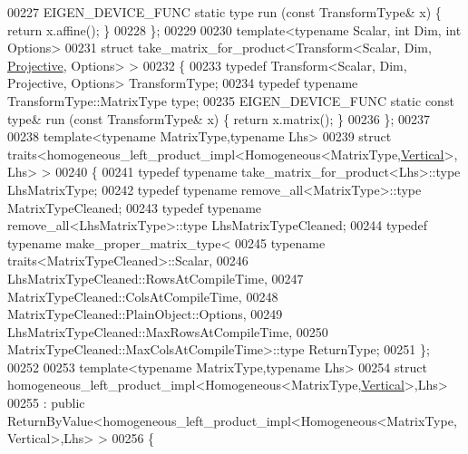 \begin{DoxyCode}
00227   EIGEN\_DEVICE\_FUNC \textcolor{keyword}{static} type run (\textcolor{keyword}{const} TransformType& x) \{ \textcolor{keywordflow}{return} x.affine(); \}
00228 \};
00229 
00230 \textcolor{keyword}{template}<\textcolor{keyword}{typename} Scalar, \textcolor{keywordtype}{int} Dim, \textcolor{keywordtype}{int} Options>
00231 \textcolor{keyword}{struct }take\_matrix\_for\_product<Transform<Scalar, Dim, \hyperlink{group__enums_ggaee59a86102f150923b0cac6d4ff05107aead6a2de12a17aaa4f5c523215dfccad}{Projective}, Options> >
00232 \{
00233   \textcolor{keyword}{typedef} Transform<Scalar, Dim, Projective, Options> TransformType;
00234   \textcolor{keyword}{typedef} \textcolor{keyword}{typename} TransformType::MatrixType type;
00235   EIGEN\_DEVICE\_FUNC \textcolor{keyword}{static} \textcolor{keyword}{const} type& run (\textcolor{keyword}{const} TransformType& x) \{ \textcolor{keywordflow}{return} x.matrix(); \}
00236 \};
00237 
00238 \textcolor{keyword}{template}<\textcolor{keyword}{typename} MatrixType,\textcolor{keyword}{typename} Lhs>
00239 \textcolor{keyword}{struct }traits<homogeneous\_left\_product\_impl<Homogeneous<MatrixType,\hyperlink{group__enums_ggad49a7b3738e273eb00932271b36127f7addca718e0564723df21d61b94b1198be}{Vertical}>,Lhs> >
00240 \{
00241   \textcolor{keyword}{typedef} \textcolor{keyword}{typename} take\_matrix\_for\_product<Lhs>::type LhsMatrixType;
00242   \textcolor{keyword}{typedef} \textcolor{keyword}{typename} remove\_all<MatrixType>::type MatrixTypeCleaned;
00243   \textcolor{keyword}{typedef} \textcolor{keyword}{typename} remove\_all<LhsMatrixType>::type LhsMatrixTypeCleaned;
00244   \textcolor{keyword}{typedef} \textcolor{keyword}{typename} make\_proper\_matrix\_type<
00245                  \textcolor{keyword}{typename} traits<MatrixTypeCleaned>::Scalar,
00246                  LhsMatrixTypeCleaned::RowsAtCompileTime,
00247                  MatrixTypeCleaned::ColsAtCompileTime,
00248                  MatrixTypeCleaned::PlainObject::Options,
00249                  LhsMatrixTypeCleaned::MaxRowsAtCompileTime,
00250                  MatrixTypeCleaned::MaxColsAtCompileTime>::type ReturnType;
00251 \};
00252 
00253 \textcolor{keyword}{template}<\textcolor{keyword}{typename} MatrixType,\textcolor{keyword}{typename} Lhs>
00254 \textcolor{keyword}{struct }homogeneous\_left\_product\_impl<Homogeneous<MatrixType,\hyperlink{group__enums_ggad49a7b3738e273eb00932271b36127f7addca718e0564723df21d61b94b1198be}{Vertical}>,Lhs>
00255   : \textcolor{keyword}{public} ReturnByValue<homogeneous\_left\_product\_impl<Homogeneous<MatrixType,Vertical>,Lhs> >
00256 \{

\end{DoxyCode}
